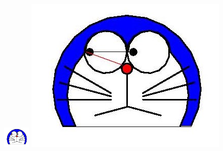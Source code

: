 \documentclass{article}
\begin{document}
\includegraphics[height=1cm]{doraemon1.jpg}
\includegraphics[height=.1\textheight]{doraemon1.jpg}
\end{document}

